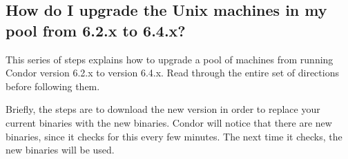 
\subsection{How do I upgrade the Unix machines in my pool from 6.2.x to 6.4.x?}

This series of steps explains how to upgrade a pool of machines
from running Condor version 6.2.x to version 6.4.x.
Read through the entire set of directions before following
them.

Briefly, the steps are to download the new version in
order to replace your current binaries with the new binaries.
Condor will notice that there are new binaries, since
it checks for this every few minutes.
The next time it checks, the new binaries will be used.


